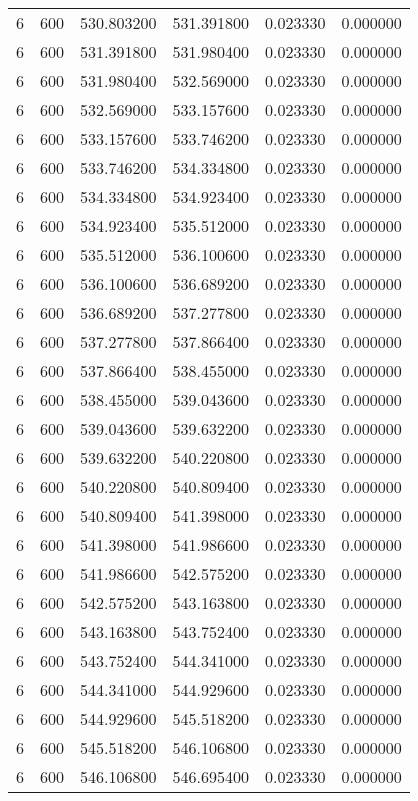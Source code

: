 \begin{longtable}{rrrrrr}
6 & 600 & 530.803200 & 531.391800 & 0.023330 & 0.000000 \\
6 & 600 & 531.391800 & 531.980400 & 0.023330 & 0.000000 \\
6 & 600 & 531.980400 & 532.569000 & 0.023330 & 0.000000 \\
6 & 600 & 532.569000 & 533.157600 & 0.023330 & 0.000000 \\
6 & 600 & 533.157600 & 533.746200 & 0.023330 & 0.000000 \\
6 & 600 & 533.746200 & 534.334800 & 0.023330 & 0.000000 \\
6 & 600 & 534.334800 & 534.923400 & 0.023330 & 0.000000 \\
6 & 600 & 534.923400 & 535.512000 & 0.023330 & 0.000000 \\
6 & 600 & 535.512000 & 536.100600 & 0.023330 & 0.000000 \\
6 & 600 & 536.100600 & 536.689200 & 0.023330 & 0.000000 \\
6 & 600 & 536.689200 & 537.277800 & 0.023330 & 0.000000 \\
6 & 600 & 537.277800 & 537.866400 & 0.023330 & 0.000000 \\
6 & 600 & 537.866400 & 538.455000 & 0.023330 & 0.000000 \\
6 & 600 & 538.455000 & 539.043600 & 0.023330 & 0.000000 \\
6 & 600 & 539.043600 & 539.632200 & 0.023330 & 0.000000 \\
6 & 600 & 539.632200 & 540.220800 & 0.023330 & 0.000000 \\
6 & 600 & 540.220800 & 540.809400 & 0.023330 & 0.000000 \\
6 & 600 & 540.809400 & 541.398000 & 0.023330 & 0.000000 \\
6 & 600 & 541.398000 & 541.986600 & 0.023330 & 0.000000 \\
6 & 600 & 541.986600 & 542.575200 & 0.023330 & 0.000000 \\
6 & 600 & 542.575200 & 543.163800 & 0.023330 & 0.000000 \\
6 & 600 & 543.163800 & 543.752400 & 0.023330 & 0.000000 \\
6 & 600 & 543.752400 & 544.341000 & 0.023330 & 0.000000 \\
6 & 600 & 544.341000 & 544.929600 & 0.023330 & 0.000000 \\
6 & 600 & 544.929600 & 545.518200 & 0.023330 & 0.000000 \\
6 & 600 & 545.518200 & 546.106800 & 0.023330 & 0.000000 \\
6 & 600 & 546.106800 & 546.695400 & 0.023330 & 0.000000 \\

\end{longtable}
